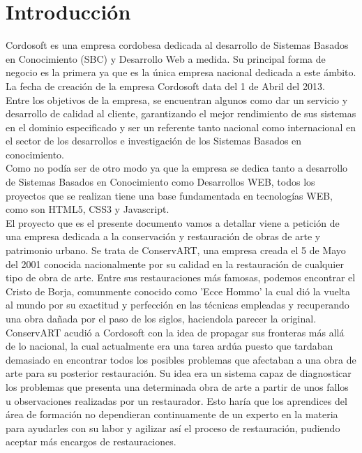 \documentclass[a4paper,11pt]{article}
\begin{document}
	\newpage
	\tableofcontents
	\newpage
	\section{Introducción}
	Cordosoft es una empresa cordobesa dedicada al desarrollo de Sistemas Basados
	en Conocimiento (SBC) y Desarrollo Web a medida. Su principal forma de negocio
	es la primera ya que es la única empresa nacional dedicada a este ámbito. La
	fecha de creación de la empresa Cordosoft data del 1 de Abril del 2013.\\
	
	Entre los objetivos de la empresa, se encuentran algunos como dar un servicio y
	desarrollo de calidad al cliente, garantizando el mejor rendimiento de sus
	sistemas en el dominio especificado y ser un referente tanto nacional como
	internacional en el sector de los desarrollos e investigación de los Sistemas
	Basados en conocimiento.\\
	
	Como no podía ser de otro modo ya que la empresa se dedica tanto a desarrollo
	de Sistemas Basados en Conocimiento como Desarrollos WEB, todos los proyectos
	que se realizan tiene una base fundamentada en tecnologías WEB, como son HTML5,
	CSS3 y Javascript.\\
	
	El proyecto que es el presente documento vamos a detallar viene a petición de
	una empresa dedicada a la conservación y restauración de obras de arte y
	patrimonio urbano. Se trata de ConservART, una empresa creada el 5 de Mayo del
	2001 conocida nacionalmente por su calidad en la restauración de cualquier tipo
	de obra de arte. Entre sus restauraciones más famosas, podemos encontrar el
	Cristo de Borja, comunmente conocido como 'Ecce Hommo' la cual dió la vuelta al
	mundo por su exactitud y perfección en las técnicas empleadas y recuperando una
	obra dañada por el paso de los siglos, haciendola parecer la original.\\
	
	ConservART acudió a Cordosoft con la idea de propagar sus fronteras más allá de
	lo nacional, la cual actualmente era una tarea ardúa puesto que tardaban
	demasiado en encontrar todos los posibles problemas que afectaban a una obra de
	arte para su posterior restauración. Su idea era un sistema capaz de
	diagnosticar los problemas que presenta una determinada obra de arte a partir
	de unos fallos u observaciones realizadas por un restaurador. Esto haría que
	los aprendices del área de formación no dependieran continuamente de un experto
	en la materia para ayudarles con su labor y agilizar así el proceso de
	restauración, pudiendo aceptar más encargos de restauraciones. \\
	
\end{document}
